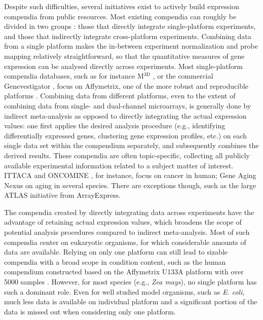 Despite such difficulties, several initiatives exist to actively build expression compendia from public resources. Most existing compendia can roughly be divided in two groups \cite{Fierro2008}: those that directly integrate single-platform experiments, and those that indirectly integrate cross-platform experiments.  Combining data from a single platform makes the in-between experiment normalization and probe mapping relatively straightforward, so that the quantitative measures of gene expression can be analysed directly across experiments. Most single-platform compendia databases, such as for instance M$^{\textrm{3D}}$ \cite{Faith2008}, or the commercial Genevestigator \cite{Hruz2008}, focus on Affymetrix, one of the more robust and reproducible platforms \cite{Bammler2005, Irizarry2005}. Combining data from different platforms, even to the extent of combining data from single- and dual-channel microarrays, is generally done by indirect meta-analysis as opposed to directly integrating the actual expression values: one first applies the desired analysis procedure (e.g., identifying differentially expressed genes, clustering gene expression profiles, etc.) on each single data set within the compendium separately, and subsequently combines the derived results. These compendia are often topic-specific, collecting all publicly available experimental information related to a subject matter of interest.  ITTACA \cite{Elfilali2006} and ONCOMINE \cite{Rhodes2007}, for instance, focus on cancer in human; Gene Aging Nexus \cite{Pan2007} on aging in several species. There are exceptions though, such as the large ATLAS \cite{Kapushesky2010} initiative from ArrayExpress.


The compendia created by directly integrating data across experiments have the advantage of retaining actual expression values, which broadens the scope of potential analysis procedures compared to indirect meta-analysis. Most of such compendia center on eukaryotic organisms, for which considerable amounts of data are available. Relying on only one platform can still lead to sizable compendia with a broad scope in condition content, such as the human compendium constructed based on the Affymetrix U133A platform with over 5000 samples \cite{Lukk2010}.  However, for most species (e.g., \textit{Zea mays}), no single platform has such a dominant role. Even for well studied model organisms, such as {\it E. coli}, much less data is available on individual platform and a significant portion of the data is missed out when considering only one platform.


